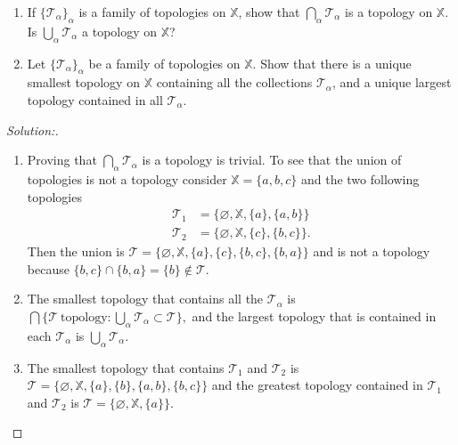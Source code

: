 \documentclass[a4paper,12pt, reqno]{article}
\theoremstyle{definition}
\newenvironment{exerr}[1]{
  \renewcommand\theexeralt{#1}
  \exeralt
}{\endexeralt}
\newenvironment{solution}{\begin{proof}[Solution:]}{\end{proof}}
\newcommand{\T}{\mathscr{T}}
\newcommand{\X}{\mathbb{X}}
\begin{document}
\begin{exerr}{4}\hfill
  \begin{enumerate}[label = (\alph*)]
    \item If $\{ \T_{\alpha} \}_{\alpha}$ is a family of topologies on $\X$, show that $\bigcap_{\alpha}\T_{\alpha}$ is a topology on $\X$. Is $\bigcup_{\alpha}\T_{\alpha}$ a topology on $\X$?
    \item Let $\{ \T_{\alpha} \}_{\alpha}$ be a family of topologies on $\X$. Show that there is a unique smallest topology on $\X$ containing all the collections $\T_{\alpha}$, and a unique largest topology contained in all $\T_{\alpha}$.
  \end{enumerate}
\end{exerr}
\begin{solution}\hfill
  \begin{enumerate}[label = (\alph*)]
    \item Proving that $\bigcap_{\alpha}\T_{\alpha}$ is a topology is trivial. To see that the union of topologies is not a topology consider $\X = \{ a,b,c \}$ and the two following topologies
    \begin{align*}
      \T_{1} &= \{ \varnothing,\X,\{ a \},\{ a,b \} \}\\
      \T_{2} &= \{ \varnothing, \X, \{ c \},\{ b,c \} \}.
    \end{align*}
    Then the union is $\T = \{ \varnothing,\X,\{ a \},\{ c \},\{ b,c \},\{ b,a \} \}$ and is not a topology because $\{ b,c \}\cap\{ b,a \} = \{ b \}\notin\T$.
    \item The smallest topology that contains all the $\T_{\alpha}$ is $\bigcap\{ \T~\text{topology} : \bigcup_{\alpha}\T_{\alpha}\subset\T \},$ and the largest topology that is contained in each $\T_{\alpha}$ is $\bigcup_{\alpha}\T_{\alpha}$.
    \item The smallest topology that contains $\T_{1}$ and $\T_{2}$ is $\T = \{ \varnothing,\X,\{ a \},\{ b \},\{ a,b \},\{ b,c \} \}$ and the greatest topology contained in $\T_{1}$ and $\T_{2}$ is $\T =\{ \varnothing,\X,\{ a \} \}$.
  \end{enumerate}
\end{solution}
\end{document}
